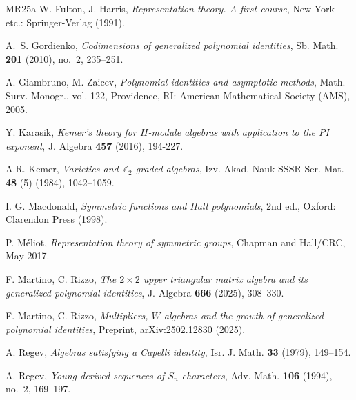 \documentclass{article}
\begin{document}
\begin{thebibliography}{MR25a}
W. Fulton, J. Harris, \emph{Representation theory. A first course}, New York etc.: Springer-Verlag (1991).

A.~S. Gordienko, \emph{Codimensions of generalized polynomial identities}, Sb. Math. \textbf{201} (2010), no.~2, 235--251.

A. Giambruno, M. Zaicev, \emph{Polynomial identities and asymptotic methods}, Math. Surv. Monogr., vol. 122, Providence, RI: American Mathematical Society (AMS), 2005.

Y. Karasik, \emph{Kemer’s theory for $H$-module algebras with application to the PI exponent}, J. Algebra \textbf{457} (2016), 194-227.

A.R. Kemer, \emph{Varieties and $\mathbb{Z}_2$-graded algebras}, Izv. Akad. Nauk SSSR Ser. Mat. \textbf{48} (5) (1984), 1042–1059.

I. G. Macdonald, \emph{Symmetric functions and Hall polynomials}, 2nd ed., Oxford: Clarendon Press (1998).

P. Méliot, \emph{Representation theory of symmetric groups}, Chapman and Hall/CRC, May 2017.

F. Martino, C. Rizzo, \emph{The {$2 \times 2$} upper triangular matrix algebra and its generalized polynomial identities}, J. Algebra \textbf{666} (2025), 308--330.

F. Martino, C. Rizzo, \emph{Multipliers, ${W}$-algebras and the growth of generalized polynomial identities}, Preprint, {arXiv}:2502.12830 (2025).

A. Regev, \emph{Algebras satisfying a {Capelli} identity}, Isr. J. Math. \textbf{33} (1979), 149--154.

A. Regev, \emph{Young-derived sequences of {{\(S_n\)}}-characters}, Adv. Math. \textbf{106} (1994), no.~2, 169--197.
\end{thebibliography}
\end{document}
